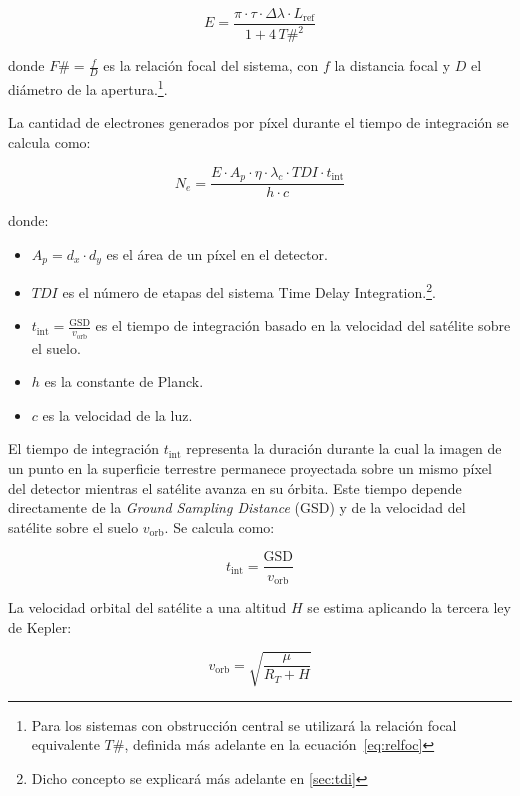 \begin{equation}
E = \frac{\pi \cdot \tau \cdot \Delta \lambda \cdot L_{\mathrm{ref}}}{1 + 4\,T\#^{2}}
\end{equation}

donde \( F\# = \frac{f}{D} \) es la relación focal del sistema, con \( f \) la distancia focal y \( D \) el diámetro de la apertura.\footnote{Para los sistemas con obstrucción central se utilizará la relación focal equivalente $T\#$, definida más adelante en la ecuación~\eqref{eq:relfoc}}.

La cantidad de electrones generados por píxel durante el tiempo de integración se calcula como:

\begin{equation}
N_e = \frac{E \cdot A_p \cdot \eta \cdot \lambda_c \cdot TDI \cdot t_{\mathrm{int}}}{h \cdot c}
\end{equation}

donde:
\begin{itemize}
    \item \( A_p = d_x \cdot d_y \) es el área de un píxel en el detector.
    \item \( TDI \) es el número de etapas del sistema Time Delay Integration.\footnote{Dicho concepto se explicará más adelante en \ref{sec:tdi}}.
    \item \( t_{\mathrm{int}} = \frac{\mathrm{GSD}}{v_{\mathrm{orb}}} \) es el tiempo de integración basado en la velocidad del satélite sobre el suelo.
    \item \( h \) es la constante de Planck.
    \item \( c \) es la velocidad de la luz.
\end{itemize}

El tiempo de integración \( t_{\mathrm{int}} \) representa la duración durante la cual la imagen de un punto en la superficie terrestre permanece proyectada sobre un mismo píxel del detector mientras el satélite avanza en su órbita. Este tiempo depende directamente de la \textit{Ground Sampling Distance} (GSD) y de la velocidad del satélite sobre el suelo \( v_{\mathrm{orb}} \). Se calcula como:

\begin{equation}
t_{\mathrm{int}} = \frac{\mathrm{GSD}}{v_{\mathrm{orb}}}
\end{equation}

La velocidad orbital del satélite a una altitud \( H\) se estima aplicando la tercera ley de Kepler:

\begin{equation}
v_{\mathrm{orb}} = \sqrt{\frac{\mu}{R_T + H}}
\end{equation}

